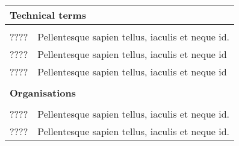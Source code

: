 
\begin{tabular}{ll}
\multicolumn{2}{l}{\textbf{Technical terms}}\\
\toprule\\
???? & Pellentesque sapien tellus, iaculis et neque id.\\
???? & Pellentesque sapien tellus, iaculis et neque id \\
???? & Pellentesque sapien tellus, iaculis et neque id\\
\bottomrule
\\
\multicolumn{2}{l}{\textbf{Organisations}}\\
\toprule\\
???? & Pellentesque sapien tellus, iaculis et neque id. \\
???? & Pellentesque sapien tellus, iaculis et neque id. \\
\bottomrule
\end{tabular}


